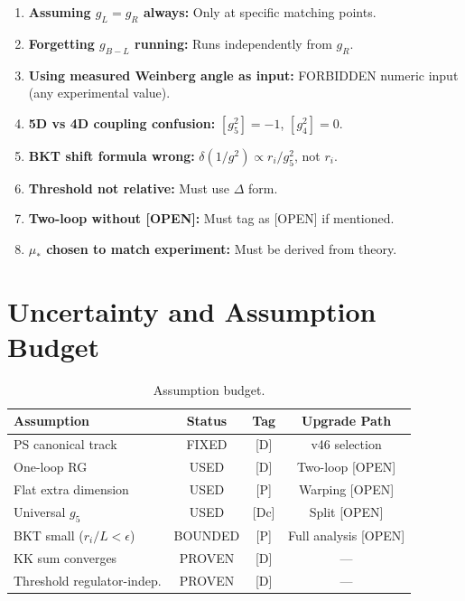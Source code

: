 \documentclass[11pt,a4paper]{article}
\begin{document}
\begin{enumerate}[label=\textbf{Trap \arabic*}:]
\item \textbf{Assuming $g_L = g_R$ always:}
Only at specific matching points.

\item \textbf{Forgetting $g_{B-L}$ running:}
Runs independently from $g_R$.

\item \textbf{Using measured Weinberg angle as input:}
FORBIDDEN numeric input (any experimental value).

\item \textbf{5D vs 4D coupling confusion:}
$[g_5^2] = -1$, $[g_4^2] = 0$.

\item \textbf{BKT shift formula wrong:}
$\delta(1/g^2) \propto r_i/g_5^2$, not $r_i$.

\item \textbf{Threshold not relative:}
Must use $\Delta$ form.

\item \textbf{Two-loop without [OPEN]:}
Must tag as [OPEN] if mentioned.

\item \textbf{$\mu_*$ chosen to match experiment:}
Must be derived from theory.

\end{enumerate}

\section{Uncertainty and Assumption Budget}
\label{sec:uncertainty}

\begin{table}[ht]
\centering
\caption{Assumption budget.}
\label{tab:assumptions}
\begin{tabular}{lccc}
\toprule
Assumption & Status & Tag & Upgrade Path \\
\midrule
PS canonical track & FIXED & [D] & v46 selection \\
One-loop RG & USED & [D] & Two-loop [OPEN] \\
Flat extra dimension & USED & [P] & Warping [OPEN] \\
Universal $g_5$ & USED & [Dc] & Split [OPEN] \\
BKT small ($r_i/L < \epsilon$) & BOUNDED & [P] & Full analysis [OPEN] \\
KK sum converges & PROVEN & [D] & — \\
Threshold regulator-indep. & PROVEN & [D] & — \\
\bottomrule
\end{tabular}
\end{table}
\end{document}
